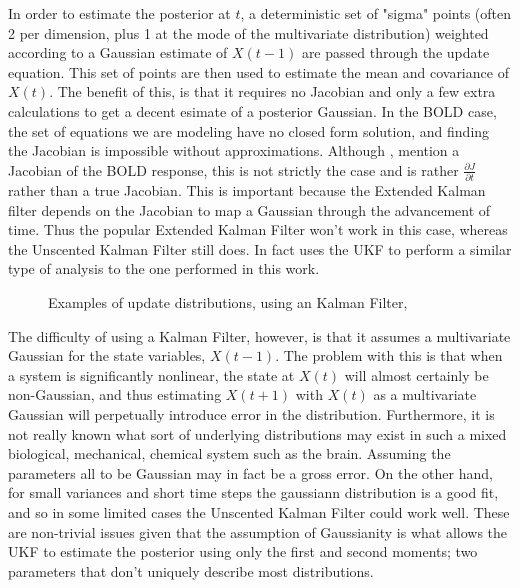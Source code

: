 In order to estimate the posterior at $t$, a deterministic set of "sigma" points 
(often 2 per dimension, plus 1 at the mode of the multivariate distribution)
weighted according to a Gaussian estimate of $X(t-1)$ are passed through
the update equation. This set of points are then used to estimate the 
mean and covariance of $X(t)$. The benefit of this, is that it requires
no Jacobian and only a few extra calculations to get a decent esimate of
a posterior Gaussian. In the BOLD case, the set of equations we are modeling have no 
closed form solution, and finding the Jacobian is impossible without approximations. Although 
\cite{Riera2004}, \cite{Hu2009} mention a Jacobian of the BOLD response, this is
not strictly the case and is rather $\frac{\partial J}{\partial t}$
rather than a true Jacobian.  This is important because the Extended
Kalman filter depends on the Jacobian to map a Gaussian through the 
advancement of time. Thus the popular Extended Kalman Filter won't work
in this case, whereas the Unscented Kalman Filter still does. In fact
\cite{Hu2009} uses the UKF to perform a similar type of analysis to
the one performed in this work. 

\begin{figure}
\caption{Examples of update distributions, using an Kalman Filter, \cite{Thrun2005}}
\label{fig:EKFWorking}
\end{figure}

The difficulty
of using a Kalman Filter, however, is that it assumes a multivariate 
Gaussian for the state variables, $X(t-1)$. The problem with this is that 
when a system is significantly nonlinear, the state at 
$X(t)$ will almost certainly be non-Gaussian, and thus estimating
$X(t+1)$ with $X(t)$ as a multivariate Gaussian will perpetually introduce
error in the distribution. Furthermore, it is not really known what 
sort of underlying distributions may exist in such a mixed biological,
mechanical, chemical system such as the brain. Assuming the parameters
all to be Gaussian may in fact be a gross error. On the other hand, for
small variances and short time steps the gaussiann distribution is a good 
fit, and so in some limited cases the Unscented Kalman Filter could work
well. These are 
non-trivial issues given that the assumption of Gaussianity is what allows
the UKF to estimate the posterior using only the first and second moments;
two parameters that don't uniquely describe most distributions.

